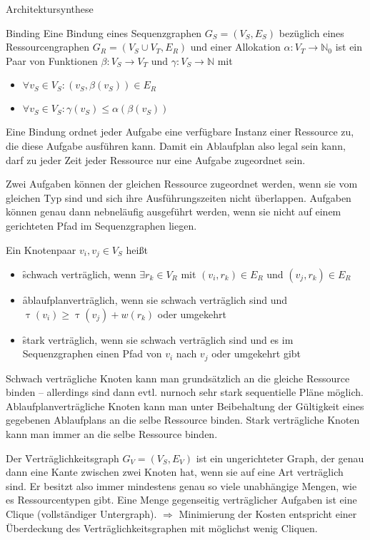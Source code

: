 \begin{chapter}{Architektursynthese}
\begin{section}{Binding}
 Eine \f{Bindung} eines Sequenzgraphen $G_S = (V_S,E_S)$ bezüglich eines Ressourcengraphen $G_R = (V_S \cup V_T, E_R)$ und einer Allokation $\alpha: V_T\rightarrow \mathbb{N}_0$ ist ein Paar von Funktionen $\beta: V_S\rightarrow V_T$ und $\gamma:V_S\rightarrow \mathbb{N}$ mit 
 \begin{itemize}
  \item $\forall v_S \in V_S: (v_S, \beta(v_S)) \in E_R$
  \item $\forall v_S \in V_S: \gamma(v_S)\leq \alpha(\beta(v_S))$
 \end{itemize}
 Eine Bindung ordnet jeder Aufgabe eine verfügbare Instanz einer Ressource zu, die diese Aufgabe ausführen kann. Damit ein Ablaufplan also legal sein kann, darf zu jeder Zeit jeder Ressource nur eine Aufgabe zugeordnet sein.
 
 Zwei Aufgaben können der gleichen Ressource zugeordnet werden, wenn sie vom gleichen Typ sind und sich ihre Ausführungszeiten nicht überlappen. Aufgaben können genau dann nebneläufig ausgeführt werden, wenn sie nicht auf einem gerichteten Pfad im Sequenzgraphen liegen.
 
 Ein Knotenpaar $v_i,v_j\in V_S$ heißt
 \begin{itemize}
  \item \f{schwach verträglich}, wenn $\exists r_k\in V_R$ mit $(v_i,r_k)\in E_R$ und $(v_j,r_k)\in E_R$
  \item \f{ablaufplanverträglich}, wenn sie schwach verträglich sind und $\uptau(v_i) \geq \uptau(v_j)+w(r_k)$ oder umgekehrt
  \item \f{stark verträglich}, wenn sie schwach verträglich sind und es im Sequenzgraphen einen Pfad von $v_i$ nach $v_j$ oder umgekehrt gibt
 \end{itemize}
 
 Schwach verträgliche Knoten kann man grundsätzlich an die gleiche Ressource binden -- allerdings sind dann evtl. nurnoch sehr stark sequentielle Pläne möglich. Ablaufplanverträgliche Knoten kann man unter Beibehaltung der Gültigkeit eines gegebenen Ablaufplans an die selbe Ressource binden. Stark verträgliche Knoten kann man immer an die selbe Ressource binden.
 
 Der \f{Verträglichkeitsgraph} $G_V=(V_S,E_V)$ ist ein ungerichteter Graph, der genau dann eine Kante zwischen zwei Knoten hat, wenn sie auf eine Art verträglich sind. Er besitzt also immer mindestens genau so viele unabhängige Mengen, wie es Ressourcentypen gibt. Eine Menge gegenseitig verträglicher Aufgaben ist eine Clique (vollständiger Untergraph). $\Rightarrow$ Minimierung der Kosten entspricht einer Überdeckung des Verträglichkeitsgraphen mit möglichst wenig Cliquen.
 

\end{section}
\end{chapter}
